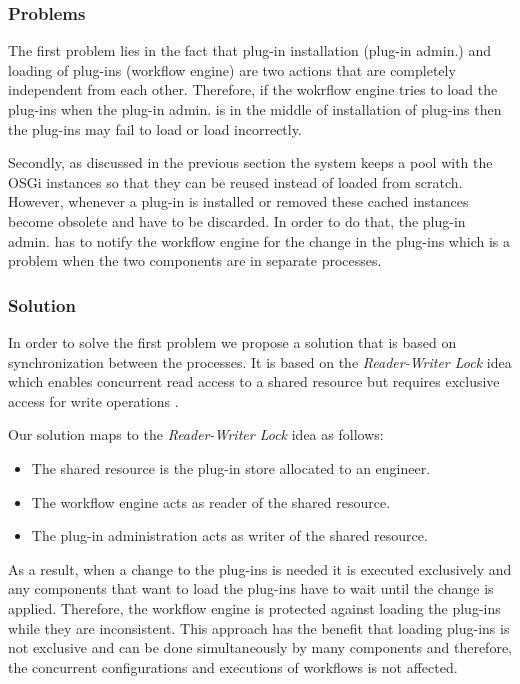 \subsubsection{Problems}

The first problem lies in the fact that plug-in installation (plug-in admin.) and loading of plug-ins (workflow engine) are two actions that are completely independent from each other. Therefore, if the wokrflow engine tries to load the plug-ins when the plug-in admin. is in the middle of installation of plug-ins then the plug-ins may fail to load or load incorrectly. 

Secondly, as discussed in the previous section the system keeps a pool with the OSGi instances so that they can be reused instead of loaded from scratch. However, whenever a plug-in is installed or removed these cached instances become obsolete and have to be discarded. In order to do that, the plug-in admin. has to notify the workflow engine for the change in the plug-ins which is a problem when the two components are in separate processes.

\subsubsection{Solution}

In order to solve the first problem we propose a solution that is based on synchronization between the processes. It is based on the \textit{Reader-Writer Lock} idea which enables concurrent read access to a shared resource but requires exclusive access for write operations \cite{lev2009scalable}.

Our solution maps to the \textit{Reader-Writer Lock} idea as follows:
\begin{itemize}
	\item The shared resource is the plug-in store allocated to an engineer.
	\item The workflow engine acts as reader of the shared resource.
	\item The plug-in administration acts as writer of the shared resource.
\end{itemize}

As a result, when a change to the plug-ins is needed it is executed exclusively and any components that want to load the plug-ins have to wait until the change is applied. Therefore, the workflow engine is protected against loading the plug-ins while they are inconsistent. This approach has the benefit that loading plug-ins is not exclusive and can be done simultaneously by many components and therefore, the concurrent configurations and executions of workflows is not affected. 

